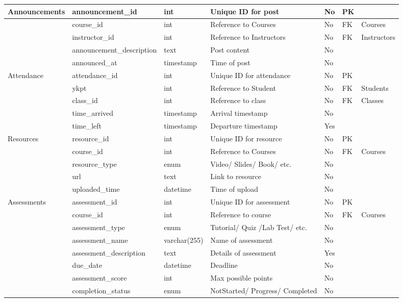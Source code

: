 \documentclass[12pt,a4paper]{report}
\begin{document}
\begin{xltabular}{\textwidth}{|L|L|L|Y|L|L|L|}
    Announcements & announcement\_id & int & Unique ID for post & No & PK & \\ \hline
     & course\_id & int & Reference to Courses & No & FK & Courses \\ \hline
     & instructor\_id & int & Reference to Instructors & No & FK & Instructors \\ \hline
     & announcement\_description & text & Post content & No & & \\ \hline
     & announced\_at & timestamp & Time of post & No & & \\ \hline

    Attendance & attendance\_id & int & Unique ID for attendance & No & PK & \\ \hline
     & ykpt & int & Reference to Student & No & FK & Students \\ \hline
     & class\_id & int & Reference to class & No & FK & Classes \\ \hline
     & time\_arrived & timestamp & Arrival timestamp & No & & \\ \hline
     & time\_left & timestamp & Departure timestamp & Yes & & \\ \hline

    Resources & resource\_id & int & Unique ID for resource & No & PK & \\ \hline
     & course\_id & int & Reference to Courses & No & FK & Courses \\ \hline
     & resource\_type & enum & Video/ Slides/ Book/ etc. & No & & \\ \hline
     & url & text & Link to resource & No & & \\ \hline
     & uploaded\_time & datetime & Time of upload & No & & \\ \hline

    Assessments & assessment\_id & int & Unique ID for assessment & No & PK & \\ \hline
     & course\_id & int & Reference to course & No & FK & Courses \\ \hline
     & assessment\_type & enum & Tutorial/ Quiz /Lab Test/ etc. & No & & \\ \hline
     & assessment\_name & varchar(255) & Name of assessment & No & & \\ \hline
     & assessment\_description & text & Details of assessment & Yes && \\ \hline
     & due\_date & datetime & Deadline & No & & \\ \hline
     & assessment\_score & int & Max possible points & No & & \\ \hline
     & completion\_status & enum & NotStarted/ Progress/ Completed & No & & \\ \hline
     

\end{xltabular}
\end{document}

